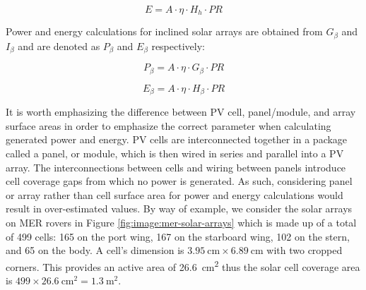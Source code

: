 \begin{equation}
  \label{eq:SA_energy}
  E = A \cdot \eta \cdot H_{h} \cdot PR
\end{equation}

Power and energy calculations for inclined solar arrays are obtained from $G_{\beta}$ and $I_{\beta}$ and are denoted as $P_{\beta}$ and $E_{\beta}$ respectively:

\begin{equation}
  \label{eq:SA_slope_power}
  P_{\beta} = A \cdot \eta \cdot G_{\beta} \cdot PR
\end{equation}


\begin{equation}
  \label{eq:SA_slope_energy}
  E_{\beta} = A \cdot \eta \cdot H_{\beta} \cdot PR
\end{equation}

It is worth emphasizing the difference between PV cell, panel/module, and array surface areas in order to emphasize the correct parameter when calculating generated power and energy. PV cells are interconnected together in a package called a panel, or module, which is then wired in series and parallel into a PV array. The interconnections between cells and wiring between panels introduce cell coverage gaps from which no power is generated. As such, considering panel or array rather than cell surface area for power and energy calculations would result in over-estimated values. By way of example, we consider the solar arrays on MER rovers in Figure \ref{fig:image:mer-solar-arrays} which is made up of a total of 499 cells: 165 on the port wing, 167 on the starboard wing, 102 on the stern, and 65 on the body. A cell's dimension is $\SI{3.95}{\centi\meter} \times \SI{6.89}{\centi\meter}$ with two cropped corners. This provides an active area of \SI{26.6}{\centi\meter\squared} thus the solar cell coverage area is $499 \times \SI{26.6}{\centi\meter\squared} = \SI{1.3}{\meter\squared}$.


